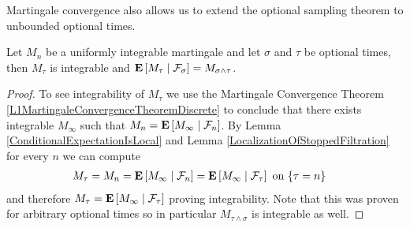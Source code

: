 Martingale convergence also allows us to extend the optional sampling
theorem to unbounded optional times.
\begin{lem}Let $M_n$ be a uniformly integrable martingale and let
  $\sigma$ and $\tau$ be optional times, then $M_\tau$ is integrable
  and $\cexpectationlong{\mathcal{F}_\sigma}{M_\tau} = M_{\sigma
    \wedge \tau}$.
\end{lem}
\begin{proof}
To see integrability of $M_\tau$ we use the Martingale Convergence
Theorem \ref{L1MartingaleConvergenceTheoremDiscrete} to conclude that
there exists integrable $M_\infty$ such that $M_n =
\cexpectationlong{\mathcal{F}_n}{M_\infty}$.  By Lemma
\ref{ConditionalExpectationIsLocal} and Lemma
\ref{LocalizationOfStoppedFiltration} for every $n$ we can compute
\begin{align*}
M_\tau &= M_n = \cexpectationlong{\mathcal{F}_n}{M_\infty} =
\cexpectationlong{\mathcal{F}_\tau}{M_\infty} \text{ on
  $\lbrace \tau = n \rbrace$}
\end{align*}
and therefore $M_\tau = \cexpectationlong{\mathcal{F}_\tau}{M_\infty}
$ proving integrability.  Note that this was proven for arbitrary
optional times so in particular $M_{\tau \wedge \sigma}$ is integrable
as well.


\end{proof}
